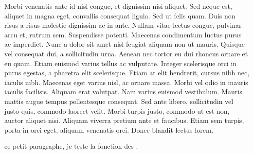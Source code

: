\documentclass{article}
\begin{document}
Morbi venenatis ante id nisl congue, et dignissim nisi aliquet. Sed neque est, aliquet in magna eget, convallis consequat ligula. Sed ut felis quam. Duis non risus a risus molestie dignissim ac in ante. Nullam vitae lectus congue, pulvinar arcu et, rutrum sem. Suspendisse potenti. Maecenas condimentum luctus purus ac imperdiet. Nunc a dolor sit amet nisl feugiat aliquam non ut mauris. Quisque vel consequat dui, a sollicitudin urna. Aenean nec tortor eu dui rhoncus ornare et eu quam.
Etiam euismod varius tellus ac vulputate. Integer scelerisque orci in purus egestas, a pharetra elit scelerisque. Etiam at elit hendrerit, cursus nibh nec, iaculis nibh. Maecenas eget varius nisl, ac ornare massa. Morbi vel odio in mauris iaculis facilisis. Aliquam erat volutpat. Nam varius euismod vestibulum. Mauris mattis augue tempus pellentesque consequat. Sed ante libero, sollicitudin vel justo quis, commodo laoreet velit. Morbi turpis justo, commodo ut est non, auctor aliquet nisi. Aliquam viverra pretium ante et faucibus. Etiam sem turpis, porta in orci eget, aliquam venenatis orci. Donec blandit lectus lorem.

ce petit paragraphe, je teste la fonction des .
\pend
\endnumbering
\end{document}
